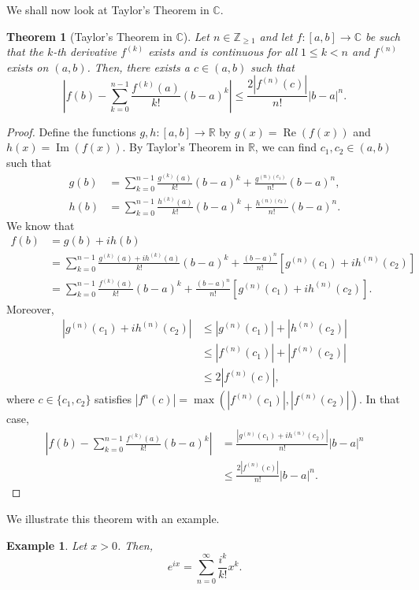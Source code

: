 \documentclass[a4paper, openany]{memoir}
\theoremstyle{definition}
\theoremstyle{plain}
\newtheorem{theorem}[definition]{Theorem}
\newtheorem{example}[definition]{Example}
\begin{document}
We shall now look at Taylor's Theorem in $\mathbb{C}$.
\begin{theorem}[Taylor's Theorem in $\mathbb{C}$]
Let $n \in \mathbb{Z}_{\geqslant 1}$ and let $f: [a, b] \to \mathbb{C}$ be such that the $k$-th derivative $f^{(k)}$ exists and is continuous for all $1 \leqslant k < n$ and $f^{(n)}$ exists on $(a, b)$. Then, there exists a $c \in (a, b)$ such that
\[\left|f(b) - \sum_{k=0}^{n-1} \frac{f^{(k)}(a)}{k!} (b - a)^k\right| \leqslant \frac{2 |f^{(n)}(c)|}{n!} |b - a|^n.\]
\end{theorem}
\begin{proof}
Define the functions $g, h: [a, b] \to \mathbb{R}$ by $g(x) = \operatorname{Re}(f(x))$ and $h(x) = \operatorname{Im}(f(x))$. By Taylor's Theorem in $\mathbb{R}$, we can find $c_1, c_2 \in (a, b)$ such that
\begin{align*}
    g(b) &= \sum_{k=0}^{n-1} \frac{g^{(k)}(a)}{k!} (b-a)^k + \frac{g^{(n)(c_1)}}{n!} (b-a)^n, \\
    h(b) &= \sum_{k=0}^{n-1} \frac{h^{(k)}(a)}{k!} (b-a)^k + \frac{h^{(n)(c_2)}}{n!} (b-a)^n.
\end{align*}
We know that
\begin{align*}
    f(b) &= g(b) + ih(b) \\
    &= \sum_{k=0}^{n-1} \frac{g^{(k)}(a) + ih^{(k)}(a)}{k!} (b-a)^k + \frac{(b-a)^n}{n!} [g^{(n)}(c_1) + ih^{(n)}(c_2)] \\
    &= \sum_{k=0}^{n-1} \frac{f^{(k)}(a)}{k!} (b-a)^k + \frac{(b-a)^n}{n!} [g^{(n)}(c_1) + ih^{(n)}(c_2)].
\end{align*}
Moreover,
\begin{align*}
    |g^{(n)}(c_1) + ih^{(n)}(c_2)| &\leqslant |g^{(n)}(c_1)| + |h^{(n)}(c_2)| \\
    &\leqslant |f^{(n)}(c_1)| + |f^{(n)}(c_2)| \\
    &\leqslant 2|f^{(n)}(c)|,
\end{align*}
where $c \in \{c_1, c_2\}$ satisfies $|f^{n}(c)| = \max(|f^{(n)}(c_1)|, |f^{(n)}(c_2)|)$. In that case,
\begin{align*}
    \left|f(b) - \sum_{k=0}^{n-1} \frac{f^{(k)}(a)}{k!} (b-a)^k\right| &= \frac{|g^{(n)}(c_1) + ih^{(n)}(c_2)|}{n!} |b-a|^n \\
    &\leqslant \frac{2|f^{(n)}(c)|}{n!} |b-a|^n.
\end{align*}
\end{proof}
\noindent We illustrate this theorem with an example.
\begin{example}
Let $x > 0$. Then,
\[e^{ix} = \sum_{n=0}^{\infty} \frac{i^k}{k!} x^k.\]
\end{example}
\end{document}

